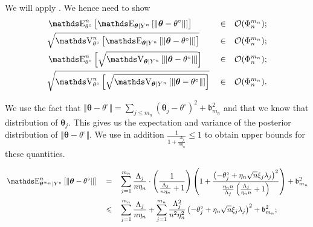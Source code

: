 \begin{pro}\label{PRO_BAYES_GAUSS_CONTRACT_SIEVE}
We will apply .
We hence need to show
\begin{alignat*}{3}
& \E_{\theta^{\circ}}^{n}\left[\E_{\boldsymbol{\theta}\vert Y^{n}}\left[\Vert \boldsymbol{\theta} - \theta^{\circ} \Vert\right]\right] && \in && \mathcal{O}(\Phi_{n}^{m_{n}});\\
& \sqrt{\V_{\theta^{\circ}}^{n}\left[\E_{\boldsymbol{\theta}\vert Y^{n}}\left[\Vert \boldsymbol{\theta} - \theta^{\circ} \Vert\right]\right]} && \in && \mathcal{O}(\Phi_{n}^{m_{n}});\\
&\E_{\theta^{\circ}}^{n}\left[\sqrt{\V_{\boldsymbol{\theta}\vert Y^{n}}\left[\Vert \boldsymbol{\theta} - \theta^{\circ} \Vert\right]}\right] && \in && \mathcal{O}(\Phi_{n}^{m_{n}});\\
&\sqrt{\V_{\theta^{\circ}}^{n}\left[\sqrt{\V_{\boldsymbol{\theta}\vert Y^{n}}\left[\Vert \boldsymbol{\theta} - \theta^{\circ} \Vert\right]}\right]} && \in && \mathcal{O}(\Phi_{n}^{m_{n}}).\\
\end{alignat*}

We use the fact that $\Vert \boldsymbol{\theta} - \theta^{\circ} \Vert = \sum\limits_{j \leq m_{n}} \left( \boldsymbol{\theta}_{j} - \theta^{\circ}\right)^{2} + \mathfrak{b}_{m_{n}}^{2}$ and that we know that distribution of $\boldsymbol{\theta}_{j}$.
This gives us the expectation and variance of the posterior distribution of $\Vert \boldsymbol{\theta} - \theta^{\circ} \Vert$.
We use in addition $\frac{1}{1 + \frac{\Lambda_{j}}{n \eta_{n}}} \leq 1$ to obtain upper bounds for these quantities.

\begin{alignat*}{3}
&\E_{\boldsymbol{\theta}^{m_{n}} \vert Y^{n}}^{n}\left[\Vert \boldsymbol{\theta} - \theta^{\circ} \Vert\right] &&=&& \sum\limits_{j = 1}^{m_{n}} \frac{\Lambda_{j}}{n \eta_{n}}\cdot \left(\frac{1}{\frac{\Lambda_{j}}{n \eta_{n}} + 1}\right)\left(1 + \frac{\left(- \theta^{\circ}_{j} + \eta_{n} \sqrt{n} \xi_{j} \lambda_{j}\right)^{2}}{\frac{\eta_{n} n}{\Lambda_{j}}\left(\frac{\Lambda_{j}}{\eta_{n} n} + 1\right)}\right) + \mathfrak{b}_{m_{n}}^{2}\\
& && \leq && \sum\limits_{j = 1}^{m_{n}} \frac{\Lambda_{j}}{n \eta_{n}} + \sum\limits_{j = 1}^{m_{n}} \frac{\Lambda_{j}^{2}}{n^{2} \eta_{n}^{2}}\left(- \theta^{\circ}_{j} + \eta_{n} \sqrt{n} \xi_{j} \lambda_{j}\right)^{2} + \mathfrak{b}_{m_{n}}^{2};
\end{alignat*}


\end{pro}
